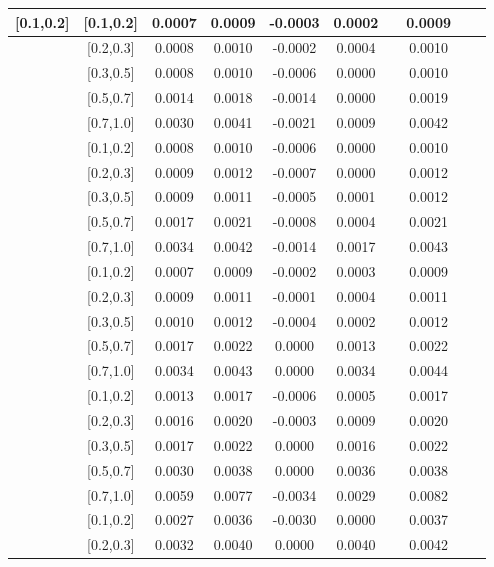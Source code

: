 \begin{table}[H]
\begin{tabular}{|c| c| c| c| c| c| c| c| c| c|}
[0.1,0.2]	&	[0.1,0.2]	&	0.0007	&	0.0009	&	-0.0003	&	0.0002	&		&	0.0009	\\ \hline
[0.1,0.2]	&	[0.2,0.3]	&	0.0008	&	0.0010	&	-0.0002	&	0.0004	&		&	0.0010	\\ \hline
[0.1,0.2]	&	[0.3,0.5]	&	0.0008	&	0.0010	&	-0.0006	&	0.0000	&		&	0.0010	\\ \hline
[0.1,0.2]	&	[0.5,0.7]	&	0.0014	&	0.0018	&	-0.0014	&	0.0000	&		&	0.0019	\\ \hline
[0.1,0.2]	&	[0.7,1.0]	&	0.0030	&	0.0041	&	-0.0021	&	0.0009	&		&	0.0042	\\ \hline
[0.2,0.3]	&	[0.1,0.2]	&	0.0008	&	0.0010	&	-0.0006	&	0.0000	&		&	0.0010	\\ \hline
[0.2,0.3]	&	[0.2,0.3]	&	0.0009	&	0.0012	&	-0.0007	&	0.0000	&		&	0.0012	\\ \hline
[0.2,0.3]	&	[0.3,0.5]	&	0.0009	&	0.0011	&	-0.0005	&	0.0001	&		&	0.0012	\\ \hline
[0.2,0.3]	&	[0.5,0.7]	&	0.0017	&	0.0021	&	-0.0008	&	0.0004	&		&	0.0021	\\ \hline
[0.2,0.3]	&	[0.7,1.0]	&	0.0034	&	0.0042	&	-0.0014	&	0.0017	&		&	0.0043	\\ \hline
[0.3,0.5]	&	[0.1,0.2]	&	0.0007	&	0.0009	&	-0.0002	&	0.0003	&		&	0.0009	\\ \hline
[0.3,0.5]	&	[0.2,0.3]	&	0.0009	&	0.0011	&	-0.0001	&	0.0004	&		&	0.0011	\\ \hline
[0.3,0.5]	&	[0.3,0.5]	&	0.0010	&	0.0012	&	-0.0004	&	0.0002	&		&	0.0012	\\ \hline
[0.3,0.5]	&	[0.5,0.7]	&	0.0017	&	0.0022	&	0.0000	&	0.0013	&		&	0.0022	\\ \hline
[0.3,0.5]	&	[0.7,1.0]	&	0.0034	&	0.0043	&	0.0000	&	0.0034	&		&	0.0044	\\ \hline
[0.5,0.7]	&	[0.1,0.2]	&	0.0013	&	0.0017	&	-0.0006	&	0.0005	&		&	0.0017	\\ \hline
[0.5,0.7]	&	[0.2,0.3]	&	0.0016	&	0.0020	&	-0.0003	&	0.0009	&		&	0.0020	\\ \hline
[0.5,0.7]	&	[0.3,0.5]	&	0.0017	&	0.0022	&	0.0000	&	0.0016	&		&	0.0022	\\ \hline
[0.5,0.7]	&	[0.5,0.7]	&	0.0030	&	0.0038	&	0.0000	&	0.0036	&		&	0.0038	\\ \hline
[0.5,0.7]	&	[0.7,1.0]	&	0.0059	&	0.0077	&	-0.0034	&	0.0029	&		&	0.0082	\\ \hline
[0.7,1.0]	&	[0.1,0.2]	&	0.0027	&	0.0036	&	-0.0030	&	0.0000	&		&	0.0037	\\ \hline
[0.7,1.0]	&	[0.2,0.3]	&	0.0032	&	0.0040	&	0.0000	&	0.0040	&		&	0.0042	\\ \hline

\end{tabular}
\end{table}
